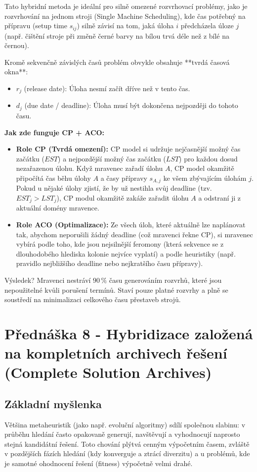 \documentclass[12pt,a4paper]{article}
\theoremstyle{definition}
\begin{document}
Tato hybridní metoda je ideální pro silně omezené rozvrhovací problémy, jako je rozvrhování na jednom stroji (Single Machine Scheduling), kde čas potřebný na přípravu (setup time $s_{ij}$) silně závisí na tom, jaká úloha $i$ předcházela úloze $j$ (např. čištění stroje při změně černé barvy na bílou trvá déle než z bílé na černou).

Kromě sekvenčně závislých časů problém obvykle obsahuje **tvrdá časová okna**:
\begin{itemize}
    \item $r_j$ (release date): Úloha nesmí začít dříve než v tento čas.
    \item $d_j$ (due date / deadline): Úloha musí být dokončena nejpozději do tohoto času.
\end{itemize}

\textbf{Jak zde funguje CP + ACO:}
\begin{itemize}
    \item \textbf{Role CP (Tvrdá omezení):} CP model si udržuje nejčasnější možný čas začátku ($EST$) a nejpozdější možný čas začátku ($LST$) pro každou dosud nezařazenou úlohu. Když mravenec zařadí úlohu $A$, CP model okamžitě připočítá čas běhu úlohy $A$ a časy přípravy $s_{A, j}$ ke všem zbývajícím úlohám $j$. Pokud u nějaké úlohy zjistí, že by už nestihla svůj deadline (tzv. $EST_j > LST_j$), CP modul okamžitě zakáže zařadit úlohu $A$ a odstraní ji z aktuální domény mravence.
    \item \textbf{Role ACO (Optimalizace):} Ze všech úloh, které aktuálně lze naplánovat tak, abychom neporušili žádný deadline (což mravenci řekne CP), si mravenec vybírá podle toho, kde jsou nejsilnější feromony (která sekvence se z dlouhodobého hlediska kolonie nejvíce vyplatí) a podle heuristiky (např. pravidlo nejbližšího deadline nebo nejkratšího času přípravy).
\end{itemize}

Výsledek? Mravenci nestráví $90\,\%$ času generováním rozvrhů, které jsou nepoužitelné kvůli porušení termínů. Staví pouze platné rozvrhy a plně se soustředí na minimalizaci celkového času přestaveb strojů.

\section{Přednáška 8 - Hybridizace založená na kompletních archivech řešení (Complete Solution Archives)}

\subsection{Základní myšlenka}
Většina metaheuristik (jako např. evoluční algoritmy) sdílí společnou slabinu: v průběhu hledání často opakovaně generují, navštěvují a vyhodnocují naprosto stejná kandidátní řešení. Toto chování plýtvá cenným výpočetním časem, zvláště v pozdějších fázích hledání (kdy konverguje a ztrácí diverzitu) a u problémů, kde je samotné ohodnocení řešení (fitness) výpočetně velmi drahé.
\end{document}
